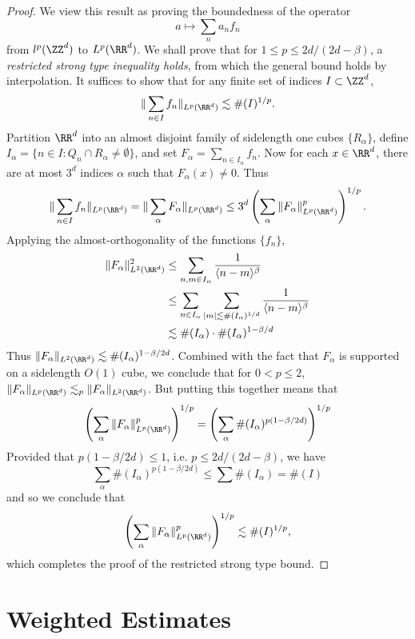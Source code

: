 \begin{proof}
  We view this result as proving the boundedness of the operator
  \[ a \mapsto \sum_n a_n f_n \]
  from $l^p(\ZZ^d)$ to $L^p(\RR^d)$. We shall prove that for $1 \leq p \leq 2d/(2d - \beta)$, a \emph{restricted strong type inequality holds}, from which the general bound holds by interpolation. It suffices to show that for any finite set of indices $I \subset \ZZ^d$,
  \[ \| \sum_{n \in I} f_n \|_{L^p(\RR^d)} \lesssim \#(I)^{1/p}. \]
  Partition $\RR^d$ into an almost disjoint family of sidelength one cubes $\{ R_\alpha \}$, define $I_\alpha = \{ n \in I : Q_n \cap R_\alpha \neq \emptyset \}$, and set $F_\alpha = \sum_{n \in I_\alpha} f_n$. Now for each $x \in \RR^d$, there are at most $3^d$ indices $\alpha$ such that $F_\alpha(x) \neq 0$. Thus
  \[ \| \sum_{n \in I} f_n \|_{L^p(\RR^d)} = \| \sum_\alpha F_\alpha \|_{L^p(\RR^d)} \leq 3^d \left( \sum_\alpha \| F_\alpha \|_{L^p(\RR^d)}^p \right)^{1/p}. \]
  Applying the almost-orthogonality of the functions $\{ f_n \}$,
  \begin{align*}
    \| F_\alpha \|_{L^2(\RR^d)}^2 &\leq \sum_{n,m \in I_\alpha} \frac{1}{\langle n - m \rangle^\beta}\\
    &\leq \sum_{n \in I_\alpha} \sum_{|m| \lesssim \#(I_\alpha)^{1/d}} \frac{1}{\langle n - m \rangle^\beta}\\
    &\lesssim \#(I_\alpha) \cdot \#(I_\alpha)^{1-\beta/d}
  \end{align*}
  Thus $\| F_\alpha \|_{L^2(\RR^d)} \lesssim \#(I_\alpha)^{1 - \beta/2d}$. Combined with the fact that $F_\alpha$ is supported on a sidelength $O(1)$ cube, we conclude that for $0 < p \leq 2$, $\| F_\alpha \|_{L^p(\RR^d)} \lesssim_p \| F_\alpha \|_{L^2(\RR^d)}$. But putting this together means that
  \[ \left( \sum_\alpha \| F_\alpha \|_{L^p(\RR^d)}^p \right)^{1/p} = \left( \sum_\alpha \#(I_\alpha)^{p(1 - \beta/2d)} \right)^{1/p} \]
  Provided that $p(1 - \beta/2d) \leq 1$, i.e. $p \leq 2d/(2d - \beta)$, we have
  \[ \sum_\alpha \#(I_\alpha)^{p(1 - \beta/2d)} \leq \sum \#(I_\alpha) = \#(I) \]
  and so we conclude that
  \[ \left( \sum_\alpha \| F_\alpha \|_{L^p(\RR^d)}^p \right)^{1/p} \lesssim \#(I)^{1/p}, \]
  which completes the proof of the restricted strong type bound.
\end{proof}







\chapter{Weighted Estimates}

